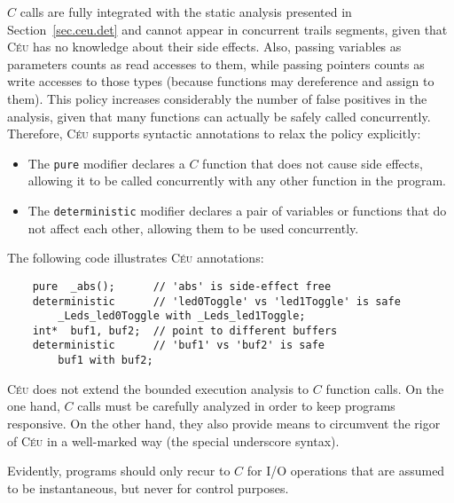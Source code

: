 \documentclass[10pt]{sensys-proc}
\newcommand{\CEU}{\textsc{C\'{e}u}\xspace}
\newcommand{\code}[1] {{\small{\texttt{#1}}}}
\begin{document}
$C$ calls are fully integrated with the static analysis presented in
Section~\ref{sec.ceu.det} and cannot appear in concurrent trails segments, 
given that \CEU has no knowledge about their side effects.
Also, passing variables as parameters counts as read accesses to them, while 
passing pointers counts as write accesses to those types (because functions may 
dereference and assign to them).
%
This policy increases considerably the number of false positives in the 
analysis, given that many functions can actually be safely called concurrently.
Therefore, \CEU supports syntactic annotations to relax the policy explicitly:

\begin{itemize}
\item The \code{pure} modifier declares a $C$ function that does not cause side 
      effects, allowing it to be called concurrently with any other function in 
the program.
\item The \code{deterministic} modifier declares a pair of variables or 
      functions that do not affect each other, allowing them to be used 
concurrently.
\end{itemize}

The following code illustrates \CEU annotations:


{\small
\begin{verbatim}
    pure  _abs();      // 'abs' is side-effect free
    deterministic      // 'led0Toggle' vs 'led1Toggle' is safe
        _Leds_led0Toggle with _Leds_led1Toggle;
    int*  buf1, buf2;  // point to different buffers
    deterministic      // 'buf1' vs 'buf2' is safe
        buf1 with buf2;
\end{verbatim}
}

\begin{comment}
TODO

Annotations are typically write-once declarations (when integrating a $C$ 
service for the first time) to be included in actual applications.
Note that the example in Figure~\ref{lst.blink} should include the annotation 
for \code{\_Leds\_led0Toggle} and \code{\_Leds\_led1Toggle} above to be 
compiled correctly.
\end{comment}

\CEU does not extend the bounded execution analysis to $C$ function calls. 
On the one hand, $C$ calls must be carefully analyzed in order to keep programs 
responsive.
On the other hand, they also provide means to circumvent the rigor of \CEU in a 
well-marked way (the special underscore syntax).
%
\begin{comment}
This approach is also adopted by Esterel, which supports the \code{call} 
primitive to execute code assumed to be instantaneous in the host 
language~\cite{esterel.primer}.
In \CEU, we take a step further and statically detects when such calls may 
execute concurrently, as discussed in the next section.
\end{comment}
%
Evidently, programs should only recur to $C$ for I/O operations that are 
assumed to be instantaneous, but never for control purposes.
\end{document}
